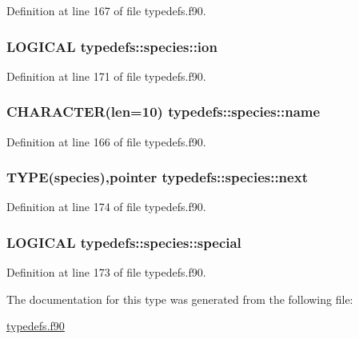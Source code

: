 Definition at line 167 of file typedefs.f90.\hypertarget{typetypedefs_1_1species_a830e248519482ca21dc78faabcf1a798}{
\subsubsection[{ion}]{\setlength{\rightskip}{0pt plus 5cm}LOGICAL {\bf typedefs::species::ion}}}
\label{typetypedefs_1_1species_a830e248519482ca21dc78faabcf1a798}


Definition at line 171 of file typedefs.f90.\hypertarget{typetypedefs_1_1species_a381a1443f34a39b9ddee08b91fdf67b3}{
\subsubsection[{name}]{\setlength{\rightskip}{0pt plus 5cm}CHARACTER(len=10) {\bf typedefs::species::name}}}
\label{typetypedefs_1_1species_a381a1443f34a39b9ddee08b91fdf67b3}


Definition at line 166 of file typedefs.f90.\hypertarget{typetypedefs_1_1species_a8b6d25cca14915e8bd825cd6bd72265b}{
\subsubsection[{next}]{\setlength{\rightskip}{0pt plus 5cm}TYPE({\bf species}),pointer {\bf typedefs::species::next}}}
\label{typetypedefs_1_1species_a8b6d25cca14915e8bd825cd6bd72265b}


Definition at line 174 of file typedefs.f90.\hypertarget{typetypedefs_1_1species_a84f8e4e86d1935d13f76a7c176f29a67}{
\subsubsection[{special}]{\setlength{\rightskip}{0pt plus 5cm}LOGICAL {\bf typedefs::species::special}}}
\label{typetypedefs_1_1species_a84f8e4e86d1935d13f76a7c176f29a67}


Definition at line 173 of file typedefs.f90.

The documentation for this type was generated from the following file:\begin{DoxyCompactItemize}
\item 
\hyperlink{typedefs_8f90}{typedefs.f90}\end{DoxyCompactItemize}
